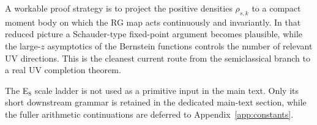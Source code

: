 \begin{remark}
A workable proof strategy is to project the positive densities $\rho_{s,k}$ to a
compact moment body on which the RG map acts continuously and invariantly. In
that reduced picture a Schauder-type fixed-point argument becomes plausible,
while the large-$z$ asymptotics of the Bernstein functions controls the number of
relevant UV directions. This is the cleanest current route from the semiclassical
branch to a real UV completion theorem.
\end{remark}

The E$_8$ scale ladder is not used as a primitive input in the main text. Only its short downstream grammar is retained in the dedicated main-text section, while the fuller arithmetic continuations are deferred to Appendix~\ref{app:constants}.

